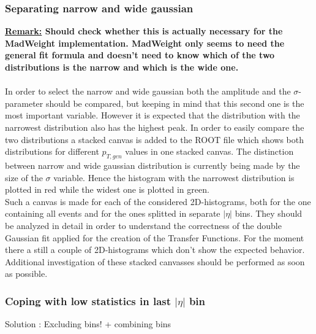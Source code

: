 \subsubsection{Separating narrow and wide gaussian}
\textbf{\underline{Remark:} Should check whether this is actually necessary for the MadWeight implementation. MadWeight only seems to need the general fit formula and doesn't need to know which of the two distributions is the narrow and which is the wide one.}\\
\\
In order to select the narrow and wide gaussian both the amplitude and the $\sigma$-parameter should be compared, but keeping in mind that this second one is the most important variable. However it is expected that the distribution with the narrowest distribution also has the highest peak. In order to easily compare the two distributions a stacked canvas is added to the ROOT file which shows both distributions for different $p_{T,gen}$ values in one stacked canvas. The distinction between narrow and wide gaussian distribution is currently being made by the size of the $\sigma$ variable. Hence the histogram with the narrowest distribution is plotted in red while the widest one is plotted in green.\\
Such a canvas is made for each of the considered 2D-histograms, both for the one containing all events and for the ones splitted in separate $\vert \eta\vert$ bins. They should be analyzed in detail in order to understand the correctness of the double Gaussian fit applied for the creation of the Transfer Functions. For the moment there a still a couple of 2D-histograms which don't show the expected behavior. Additional investigation of these stacked canvasses should be performed as soon as possible.

\subsubsection{Coping with low statistics in last $\vert \eta \vert$ bin}
Solution : Excluding bins! + combining bins

